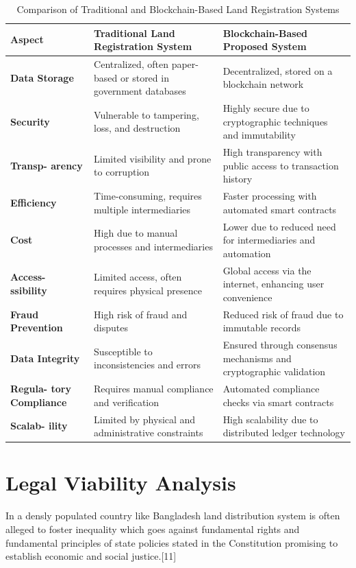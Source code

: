 \documentclass[conference]{IEEEtran}
\begin{document}
\begin{table}[H]
    \centering
    \begin{tabular}{|p{1cm}|p{3cm}|p{3cm}|}
        \hline
        \textbf{Aspect} & \textbf{Traditional Land Registration System} & \textbf{Blockchain-Based Proposed System} \\
        \hline
        \textbf{Data Storage} & Centralized, often paper-based or stored in government databases & Decentralized, stored on a blockchain network \\
        \hline
        \textbf{Security} & Vulnerable to tampering, loss, and destruction & Highly secure due to cryptographic techniques and immutability \\
        \hline
        \textbf{Transp- arency} & Limited visibility and prone to corruption & High transparency with public access to transaction history \\
        \hline
        \textbf{Efficiency} & Time-consuming, requires multiple intermediaries & Faster processing with automated smart contracts \\
        \hline
        \textbf{Cost} & High due to manual processes and intermediaries & Lower due to reduced need for intermediaries and automation \\
        \hline
        \textbf{Access- ssibility} & Limited access, often requires physical presence & Global access via the internet, enhancing user convenience \\
        \hline
        \textbf{Fraud Prevention} & High risk of fraud and disputes & Reduced risk of fraud due to immutable records \\
        \hline
        \textbf{Data Integrity} & Susceptible to inconsistencies and errors & Ensured through consensus mechanisms and cryptographic validation \\
        \hline
        \textbf{Regula- tory Compliance} & Requires manual compliance and verification & Automated compliance checks via smart contracts \\
        \hline
        \textbf{Scalab- ility} & Limited by physical and administrative constraints & High scalability due to distributed ledger technology \\
        \hline
    \end{tabular}
    \caption{Comparison of Traditional and Blockchain-Based Land Registration Systems}
    \label{table:comparison}
\end{table}

\section{Legal Viability Analysis}
In a densly populated country like Bangladesh land distribution system is often alleged to foster inequality which goes against fundamental rights and fundamental principles of state policies stated in the Constitution promising to establish economic and social justice.[11]
\end{document}
